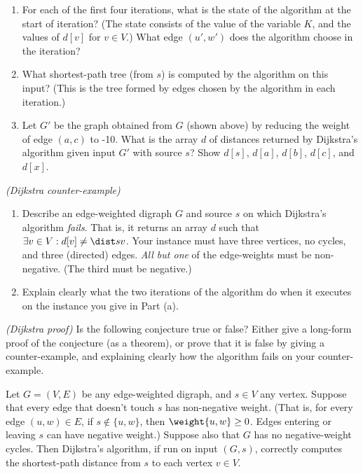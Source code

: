 \begin{enumerate}[label=(\alph*)]
\item For each of the first four iterations,
  what is the state of the algorithm at the start of iteration?
  (The state consists of the value of the variable $K$,
  and the values of $d[v]$ for $v\in V$.)
  What edge $(u', w')$ does the algorithm choose in the iteration?

\item
What shortest-path tree (from $s$) is computed by the algorithm on this input?
(This is the tree formed by edges chosen by the algorithm in each iteration.)

\item  
  Let $G'$ be the graph obtained from $G$ (shown above) by reducing the weight of edge $(a, c)$ to -10.
What is the array $d$ of distances returned by Dijkstra's algorithm given input $G'$ with source $s$?
Show $d[s]$, $d[a]$, $d[b]$, $d[c]$, and $d[x]$.
\end{enumerate}

\exercise\emph{(Dijkstra counter-example)} %
\begin{enumerate}[label=(\alph*)]
  \item Describe an edge-weighted digraph $G$ and source $s$
    on which Dijkstra's algorithm \emph{fails}.
    That is, it returns an array $d$ such that $\exists v\in V : d[v] \ne \dist s v$.
    Your instance must have three vertices, no cycles,
    and three (directed) edges.
    \emph{All but one} of the edge-weights must be non-negative.
    (The third must be negative.)

  \item
Explain clearly what the two iterations of the algorithm
do when it executes on the instance you give in Part (a).
\end{enumerate}

\exercise\label{greedy: exercise: Dijkstra proof}\emph{(Dijkstra proof)} %
Is the following conjecture true or false?
Either give a long-form proof of the conjecture (as a theorem),
or prove that it is false by giving a counter-example,
and explaining clearly how the algorithm fails on your counter-example.

\begin{conjecture}\label{greedy: dijkstra 2}
  Let $G=(V,E)$ be any edge-weighted digraph, and $s\in V$ any vertex.
  Suppose that every edge that doesn't touch $s$ has non-negative weight.
  (That is, for every edge $(u,w)\in E$, if $s\not\in \{u,w\}$, then $\weight {u,w} \ge 0$.
  Edges entering or leaving $s$ can have negative weight.)
  Suppose also that $G$ has no negative-weight cycles. 
  Then Dijkstra's algorithm, if run on input $(G,s)$,
  correctly computes the shortest-path distance from $s$ to each vertex $v\in V$.
\end{conjecture}

